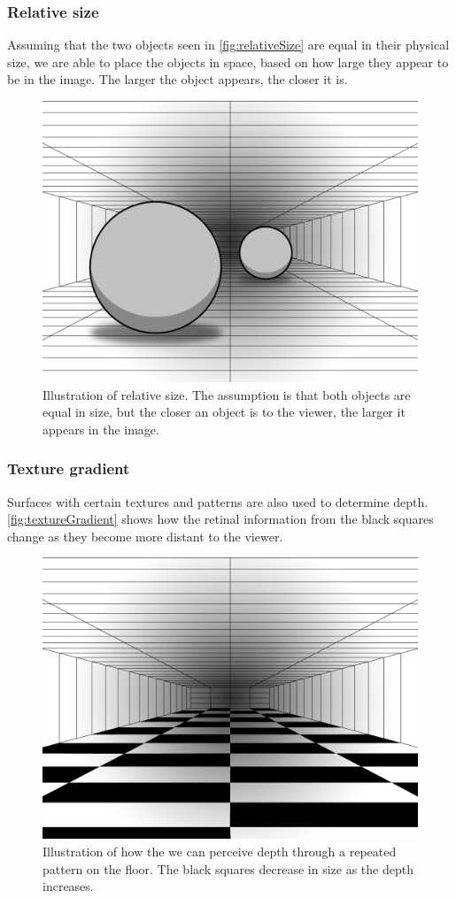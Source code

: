 \subsubsection{Relative size}
Assuming that the two objects seen in \autoref{fig:relativeSize} are equal in their physical size, we are able to place the objects in space, based on how large they appear to be in the image. The larger the object appears, the closer it is\citep[p.~200]{sensationPerception}.
\begin{figure}[H]
	\centering
	\includegraphics[width=0.6\linewidth]{figure/Analysis/relativeSize.png}
	\caption{Illustration of relative size. The assumption is that both objects are equal in size, but the closer an object is to the viewer, the larger it appears in the image.}
	\label{fig:relativeSize}
\end{figure}

\subsubsection{Texture gradient}
Surfaces with certain textures and patterns are also used to determine depth. \autoref{fig:textureGradient} shows how the retinal information from the black squares change as they become more distant to the viewer.
\citep[p.~201]{sensationPerception}
\begin{figure}[H]
	\centering
	\includegraphics[width=0.6\linewidth]{figure/Analysis/textureGradient.png}
	\caption{Illustration of how the we can perceive depth through a repeated pattern on the floor. The black squares decrease in size as the depth increases.}
	\label{fig:textureGradient}
\end{figure}

